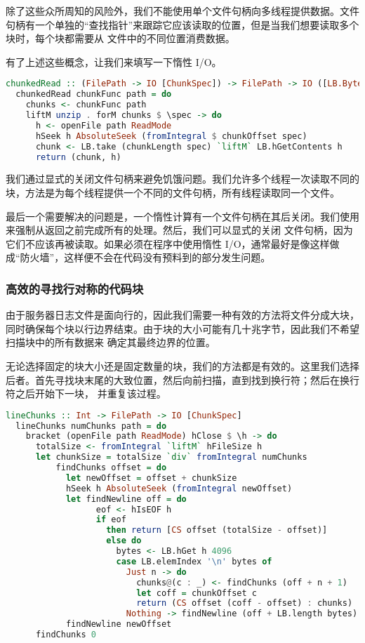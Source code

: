 \documentclass[./main.tex]{subfiles}
\begin{document}
除了这些众所周知的风险外，我们不能使用单个文件句柄向多线程提供数据。文件句柄有一个单独的“查找指针”来跟踪它应该读取的位置，但是当我们想要读取多个块时，每个块都需要从
文件中的不同位置消费数据。

有了上述这些概念，让我们来填写一下惰性 I/O。

\begin{lstlisting}[language=Haskell]
  chunkedRead :: (FilePath -> IO [ChunkSpec]) -> FilePath -> IO ([LB.ByteString], [Handle])
  chunkedRead chunkFunc path = do
    chunks <- chunkFunc path
    liftM unzip . forM chunks $ \spec -> do
      h <- openFile path ReadMode
      hSeek h AbsoluteSeek (fromIntegral $ chunkOffset spec)
      chunk <- LB.take (chunkLength spec) `liftM` LB.hGetContents h
      return (chunk, h)
\end{lstlisting}

我们通过显式的关闭文件句柄来避免饥饿问题。我们允许多个线程一次读取不同的块，方法是为每个线程提供一个不同的文件句柄，所有线程读取同一个文件。

最后一个需要解决的问题是，一个惰性计算有一个文件句柄在其后关闭。我们使用来强制从返回之前完成所有的处理。然后，我们可以显式的关闭
文件句柄，因为它们不应该再被读取。如果必须在程序中使用惰性 I/O，通常最好是像这样做成“防火墙”，这样便不会在代码没有预料到的部分发生问题。

\subsubsection*{高效的寻找行对称的代码块}

由于服务器日志文件是面向行的，因此我们需要一种有效的方法将文件分成大块，同时确保每个块以行边界结束。由于块的大小可能有几十兆字节，因此我们不希望扫描块中的所有数据来
确定其最终边界的位置。

无论选择固定的块大小还是固定数量的块，我们的方法都是有效的。这里我们选择后者。首先寻找块末尾的大致位置，然后向前扫描，直到找到换行符；然后在换行符之后开始下一块，
并重复该过程。

\begin{lstlisting}[language=Haskell]
  lineChunks :: Int -> FilePath -> IO [ChunkSpec]
  lineChunks numChunks path = do
    bracket (openFile path ReadMode) hClose $ \h -> do
      totalSize <- fromIntegral `liftM` hFileSize h
      let chunkSize = totalSize `div` fromIntegral numChunks
          findChunks offset = do
            let newOffset = offset + chunkSize
            hSeek h AbsoluteSeek (fromIntegral newOffset)
            let findNewline off = do
                  eof <- hIsEOF h
                  if eof
                    then return [CS offset (totalSize - offset)]
                    else do
                      bytes <- LB.hGet h 4096
                      case LB.elemIndex '\n' bytes of
                        Just n -> do
                          chunks@(c : _) <- findChunks (off + n + 1)
                          let coff = chunkOffset c
                          return (CS offset (coff - offset) : chunks)
                        Nothing -> findNewline (off + LB.length bytes)
            findNewline newOffset
      findChunks 0
\end{lstlisting}
\end{document}
